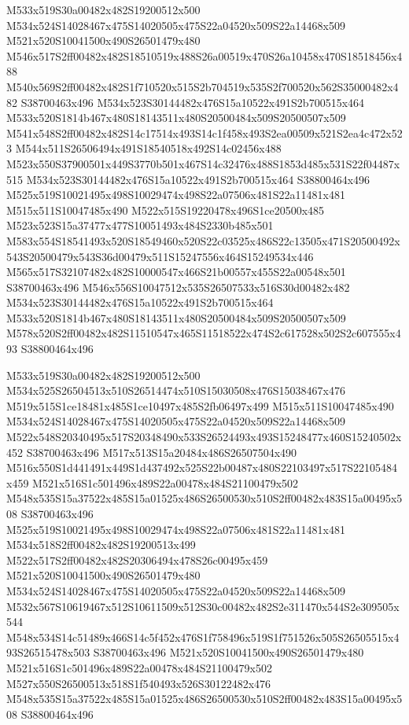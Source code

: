 \documentclass{article}
\begin{document}
\begin{multicols}{2}
M533x519S30a00482x482S19200512x500 M534x524S14028467x475S14020505x475S22a04520x509S22a14468x509 M521x520S10041500x490S26501479x480 M546x517S2ff00482x482S18510519x488S26a00519x470S26a10458x470S18518456x488 M540x569S2ff00482x482S1f710520x515S2b704519x535S2f700520x562S35000482x482 S38700463x496 M534x523S30144482x476S15a10522x491S2b700515x464 M533x520S1814b467x480S18143511x480S20500484x509S20500507x509 M541x548S2ff00482x482S14c17514x493S14c1f458x493S2ea00509x521S2ea4c472x523 M544x511S26506494x491S18540518x492S14c02456x488 M523x550S37900501x449S3770b501x467S14c32476x488S1853d485x531S22f04487x515 M534x523S30144482x476S15a10522x491S2b700515x464 S38800464x496 M525x519S10021495x498S10029474x498S22a07506x481S22a11481x481 M515x511S10047485x490 M522x515S19220478x496S1ce20500x485 M523x523S15a37477x477S10051493x484S2330b485x501 M583x554S18541493x520S18549460x520S22c03525x486S22c13505x471S20500492x543S20500479x543S36d00479x511S15247556x464S15249534x446 M565x517S32107482x482S10000547x466S21b00557x455S22a00548x501 S38700463x496 M546x556S10047512x535S26507533x516S30d00482x482 M534x523S30144482x476S15a10522x491S2b700515x464 M533x520S1814b467x480S18143511x480S20500484x509S20500507x509 M578x520S2ff00482x482S11510547x465S11518522x474S2c617528x502S2c607555x493 S38800464x496

M533x519S30a00482x482S19200512x500 M534x525S26504513x510S26514474x510S15030508x476S15038467x476 M519x515S1ce18481x485S1ce10497x485S2fb06497x499 M515x511S10047485x490 M534x524S14028467x475S14020505x475S22a04520x509S22a14468x509 M522x548S20340495x517S20348490x533S26524493x493S15248477x460S15240502x452 S38700463x496 M517x513S15a20484x486S26507504x490 M516x550S1d441491x449S1d437492x525S22b00487x480S22103497x517S22105484x459 M521x516S1c501496x489S22a00478x484S21100479x502 M548x535S15a37522x485S15a01525x486S26500530x510S2ff00482x483S15a00495x508 S38700463x496 M525x519S10021495x498S10029474x498S22a07506x481S22a11481x481 M534x518S2ff00482x482S19200513x499 M522x517S2ff00482x482S20306494x478S26c00495x459 M521x520S10041500x490S26501479x480 M534x524S14028467x475S14020505x475S22a04520x509S22a14468x509 M532x567S10619467x512S10611509x512S30c00482x482S2e311470x544S2e309505x544 M548x534S14c51489x466S14c5f452x476S1f758496x519S1f751526x505S26505515x493S26515478x503 S38700463x496 M521x520S10041500x490S26501479x480 M521x516S1c501496x489S22a00478x484S21100479x502 M527x550S26500513x518S1f540493x526S30122482x476 M548x535S15a37522x485S15a01525x486S26500530x510S2ff00482x483S15a00495x508 S38800464x496


\end{multicols}
\end{document}
